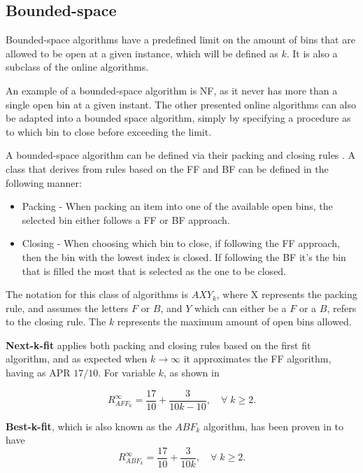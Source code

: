 \subsection{Bounded-space} 

Bounded-space algorithms have a predefined limit on the amount of bins that are
allowed to be open at a given instance, which will be defined as $k$. It is also
a subclass of the online algorithms.

An example of a bounded-space algorithm is NF, as it never has more than a
single open bin at a given instant. The other presented online algorithms can
also be adapted into a bounded space algorithm, simply by specifying a procedure
as to which bin to close before exceeding the limit.

A bounded-space algorithm can be defined via their packing and closing rules
\cite{coffman2013bin}. A class that derives from rules based on the FF and BF
can be defined in the following manner: 
\begin{itemize}
    \item Packing - When packing an item into one of the available open bins,
        the selected bin either follows a FF or BF approach.
    \item Closing - When choosing which bin to close, if following the FF
        approach, then the bin with the lowest index is closed. If following the
        BF it's the bin that is filled the most that is selected as the one to
        be closed.
\end{itemize}

The notation for this class of algorithms is $AXY_k$, where X represents the
packing rule, and assumes the letters $F$ or $B$, and $Y$ which can either be a
$F$ or a $B$, refers to the closing rule. The $k$ represents the maximum amount
of open bins allowed.

\textbf{Next-k-fit} applies both packing and closing rules based on the first
fit algorithm, and as expected when $k \to \infty$ it approximates the FF
algorithm, having as APR $17/10$. For variable $k$, as shown in
\cite{mao1993tight}

\begin{equation}
    R_{AFF_k}^\infty = \frac{17}{10} + \frac{3}{10k - 10}, \quad \forall \; k \geq 2.
\end{equation}

\textbf{Best-k-fit}, which is also known as the $ABF_k$ algorithm, has been
proven in \cite{mao1993besk} to have
\begin{equation}
    R_{ABF_k}^\infty = \frac{17}{10} + \frac{3}{10k}, \quad  \forall \; k \geq 2.
\end{equation}

